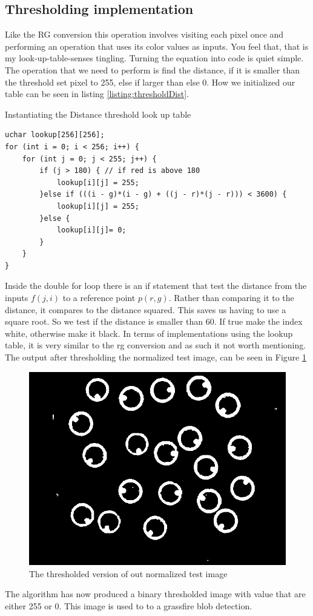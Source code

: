 \subsection{Thresholding implementation}
Like the RG conversion this operation involves visiting each pixel once and performing an operation that uses its color values as inputs. You feel that, that is my look-up-table-senses tingling. Turning the equation into code is quiet simple. The operation that we need to perform is find the distance, if it is smaller than the threshold  set pixel to 255, else if larger than  else 0. How we initialized our table can be seen in listing \ref{listing:thresholdDist}.

\begin{listing}[H]
	\caption{Instantiating the Distance threshold look up table}
	\label{listing:thresholdDist}
	\begin{verbatim}
uchar lookup[256][256];
for (int i = 0; i < 256; i++) {
	for (int j = 0; j < 255; j++) {
		if (j > 180) { // if red is above 180
			lookup[i][j] = 255;
		}else if (((i - g)*(i - g) + ((j - r)*(j - r))) < 3600) {
			lookup[i][j] = 255;
		}else {
			lookup[i][j]= 0;
		}
	}
}
\end{verbatim}
\end{listing}

Inside the double for loop there is an if statement that test the distance from the inputs $f(j,i)$ to a reference point $p(r,g)$. Rather than comparing it to the distance, it compares to the distance squared. This saves us having to use a square root. So we test if the distance is smaller than 60. If true make the index white, otherwise make it black. 
In terms of implementations using the lookup table, it is very similar to the rg conversion and as such it not worth mentioning. The output after thresholding the normalized test image, can be seen in Figure \ref{fig:thsnapshot}\\
\begin{figure}[H]
	\centering
	\includegraphics[width=0.6\linewidth]{figure/Analysis/thresholded.png}
	\caption{The thresholded version of out normalized test image}
	\label{fig:thsnapshot}
\end{figure} 
The algorithm has now produced a binary thresholded image with value that are either 255 or 0. This image is used to to a grassfire blob detection. 
